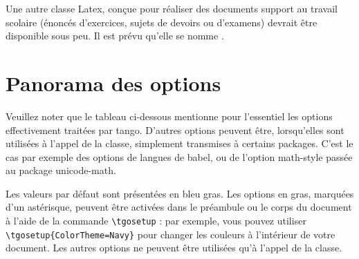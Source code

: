 \documentclass[french,ColorTheme=USAF,FontSize=10pt]{tango}
\newcommand\TO[1]{\textsf{#1}}
\begin{document}
Une autre classe Latex, conçue pour réaliser des documents support au travail scolaire (énoncés d'exercices, sujets de devoirs ou d'examens) devrait être disponible sous peu. Il est prévu qu'elle se nomme \frquote{\TO{bravo}}.

\section{Panorama des options}
Veuillez noter que le tableau ci-dessous mentionne pour l’essentiel les options effectivement traitées par tango. D'autres options peuvent être, lorsqu’elles sont utilisées à l'appel de la classe, simplement transmises à certains packages. C'est le cas par exemple des options de langues de babel, ou de l'option \TO{math-style} passée au package unicode-math. 

Les valeurs par défaut sont présentées en bleu gras. Les options en gras, marquées d'un astérisque, peuvent être activées dans le préambule ou le corps du document à l'aide de la commande \verb+\tgosetup+ : par exemple, vous pouvez utiliser \verb+\tgosetup{ColorTheme=Navy}+ pour changer les couleurs à l'intérieur de votre document. Les autres options ne peuvent être utilisées qu'à l'appel de la classe.
\end{document}
